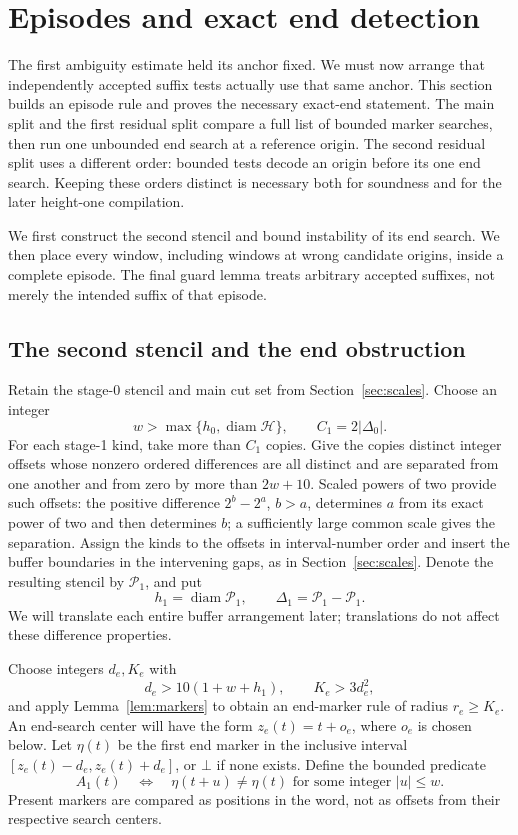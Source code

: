 \section{Episodes and exact end detection}
\label{sec:episodes}

The first ambiguity estimate held its anchor fixed. We must now arrange
that independently accepted suffix tests actually use that same anchor.
This section builds an episode rule and proves the necessary exact-end
statement. The main split and the first residual split compare a full list
of bounded marker searches, then run one unbounded end search at a reference
origin. The second residual split uses a different order: bounded tests
decode an origin before its one end search. Keeping these orders distinct
is necessary both for soundness and for the later height-one compilation.

We first construct the second stencil and bound instability of its end
search. We then place every window, including windows at wrong candidate
origins, inside a complete episode. The final guard lemma treats arbitrary
accepted suffixes, not merely the intended suffix of that episode.

\subsection{The second stencil and the end obstruction}

Retain the stage-0 stencil and main cut set from Section~\ref{sec:scales}.
Choose an integer
\[
 w>\max\{h_0,\operatorname{diam}\mathcal H\},
 \qquad C_1=2|\Delta_0|.
\]
For each stage-1 kind, take more than $C_1$ copies.  Give the copies
distinct integer offsets whose nonzero ordered differences are all distinct
and are separated from one another and from zero by more than $2w+10$.
Scaled powers of two provide such offsets: the positive difference
$2^b-2^a$, $b>a$, determines $a$ from its exact power of two and then
determines $b$; a sufficiently large common scale gives the separation.
Assign the kinds to the offsets in interval-number order and insert the
buffer boundaries in the intervening gaps, as in
Section~\ref{sec:scales}.  Denote the resulting stencil by $\mathcal P_1$,
and put
\[
 h_1=\operatorname{diam}\mathcal P_1,
 \qquad \Delta_1=\mathcal P_1-\mathcal P_1.
\]
We will translate each entire buffer arrangement later; translations do not
affect these difference properties.

Choose integers $d_e,K_e$ with
\[
 d_e>10(1+w+h_1),\qquad K_e>3d_e^2,
\]
and apply Lemma~\ref{lem:markers} to obtain an end-marker rule of radius
$r_e\ge K_e$.  An end-search center will have the form
$z_e(t)=t+o_e$, where $o_e$ is chosen below.  Let $\eta(t)$ be the first
end marker in the inclusive interval
$[z_e(t)-d_e,z_e(t)+d_e]$, or $\bot$ if none exists.  Define the bounded
predicate
\begin{equation}
 \label{eq:end-obstruction}
 A_1(t)\quad\Longleftrightarrow\quad
 \eta(t+u)\ne\eta(t)\text{ for some integer }|u|\le w.
\end{equation}
Present markers are compared as positions in the word, not as offsets from
their respective search centers.

